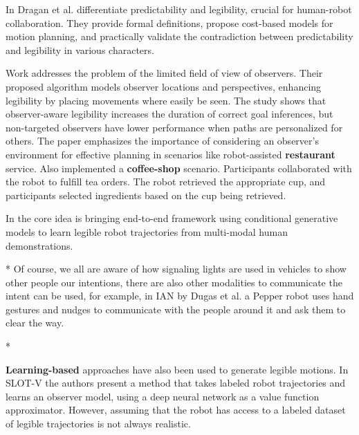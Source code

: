 In \cite{dragan2013legibility} Dragan et al. differentiate predictability and legibility, crucial for human-robot collaboration.
They provide formal definitions, propose cost-based models for motion planning, and practically validate the contradiction between predictability and legibility in various characters.

Work \cite{taylor2022observeraware} addresses the problem of the limited field of view of observers.
Their proposed algorithm models observer locations and perspectives, enhancing legibility by placing movements where easily be seen.
The study shows that observer-aware legibility increases the duration of correct goal inferences, but non-targeted observers have lower performance when paths are personalized for others.
The paper emphasizes the importance of considering an observer's environment for effective planning in scenarios like robot-assisted \textbf{restaurant} service.
Also \cite{dragan2015effects} implemented a \textbf{coffee-shop} scenario. Participants collaborated with the robot to fulfill tea orders.
The robot retrieved the appropriate cup, and participants selected ingredients based on the cup being retrieved.

In \cite{bronars2023_GLMM} the core idea is bringing end-to-end framework using conditional generative models to learn legible robot trajectories from multi-modal human demonstrations. 
%

* Of course, we all are aware of how signaling lights are used in vehicles to show other people our intentions,
there are also other modalities to communicate the intent can be used,
for example, in IAN by Dugas et al. \cite{dugas2020_IAN} a Pepper robot uses hand gestures and nudges to communicate with the people around it and ask them to clear the way.

* \cite{fukuchi2009focus}

\textbf{Learning-based} approaches have also been used to generate legible motions.
In SLOT-V \cite{XXX} the authors present a method that takes labeled robot trajectories and learns an observer model, using a deep neural network as a value function approximator.
However, assuming that the robot has access to a labeled dataset of legible trajectories is not always realistic.